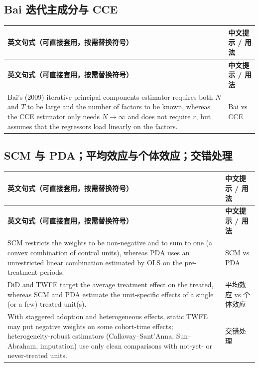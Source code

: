\subsection{Bai 迭代主成分与 CCE}

{\renewcommand{\arraystretch}{1.15}\begin{longtable}{@{}>{\raggedright\arraybackslash}p{11.4cm}>{\raggedright\arraybackslash\small}p{4.3cm}@{}}
\toprule
\textbf{英文句式（可直接套用，按需替换符号）} & \textbf{中文提示 / 用法}\\
\midrule
\endfirsthead
\toprule
\textbf{英文句式（可直接套用，按需替换符号）} & \textbf{中文提示 / 用法}\\
\midrule
\endhead
\bottomrule
\endlastfoot
Bai's (2009) iterative principal components estimator requires both $N$ and $T$ to be large and the number of factors to be known, whereas the CCE estimator only needs $N\to\infty$ and does not require $r$, but assumes that the regressors load linearly on the factors. & Bai vs CCE\\
\end{longtable}}


\subsection{SCM 与 PDA；平均效应与个体效应；交错处理}

{\renewcommand{\arraystretch}{1.15}\begin{longtable}{@{}>{\raggedright\arraybackslash}p{11.4cm}>{\raggedright\arraybackslash\small}p{4.3cm}@{}}
\toprule
\textbf{英文句式（可直接套用，按需替换符号）} & \textbf{中文提示 / 用法}\\
\midrule
\endfirsthead
\toprule
\textbf{英文句式（可直接套用，按需替换符号）} & \textbf{中文提示 / 用法}\\
\midrule
\endhead
\bottomrule
\endlastfoot
SCM restricts the weights to be non-negative and to sum to one (a convex combination of control units), whereas PDA uses an unrestricted linear combination estimated by OLS on the pre-treatment periods. & SCM vs PDA\\
\addlinespace[2pt]
DiD and TWFE target the average treatment effect on the treated, whereas SCM and PDA estimate the unit-specific effects of a single (or a few) treated unit(s). & 平均效应 vs 个体效应\\
\addlinespace[2pt]
With staggered adoption and heterogeneous effects, static TWFE may put negative weights on some cohort-time effects; heterogeneity-robust estimators (Callaway--Sant'Anna, Sun--Abraham, imputation) use only clean comparisons with not-yet- or never-treated units. & 交错处理\\
\end{longtable}}


